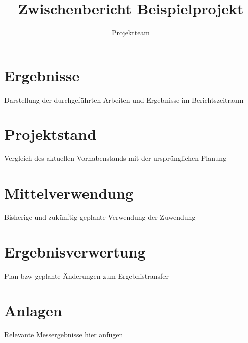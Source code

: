 \documentclass[type=zwischenbericht]{zukunftbau}
\title{Zwischenbericht Beispielprojekt}
\author{Projektteam}
\begin{document}
\makecoverpages


\section{Ergebnisse}
Darstellung der durchgeführten Arbeiten und Ergebnisse im Berichtszeitraum

\section{Projektstand}
Vergleich des aktuellen Vorhabenstands mit der ursprünglichen Planung

\section{Mittelverwendung}
Bisherige und zukünftig geplante Verwendung der Zuwendung

\section{Ergebnisverwertung}
Plan bzw geplante Änderungen zum Ergebnistransfer

\appendix
\section{Anlagen}
Relevante Messergebnisse hier anfügen
\end{document}
